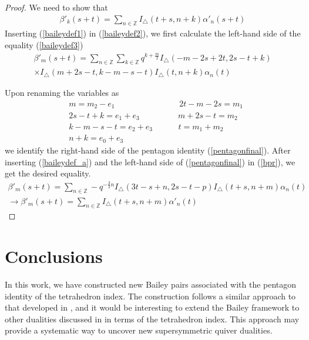 \documentclass[11pt,a4paper]{article}
\begin{document}
\begin{proof} We need to show that
\begin{align}
     \beta'_k (s + t)= \sum_{n \in \mathbb{Z}} I_{\triangle}(t + s, n + k) \alpha'_n(s + t)
     \label{baileydef3}
\end{align}
Inserting (\ref{baileydef1}) in (\ref{baileydef2}), we first calculate the left-hand side of the equality (\ref{baileydef3})
\begin{multline} \label{bpr}
    \beta'_m(s + t)= 
    \sum_{n \in \mathbb{Z}} \sum_{k \in \mathbb{Z}}q^{k + \frac{m}{2}}  I_{\triangle}(-m - 2s + 2t,2s - t + k)\\ \times I_{\triangle}(m + 2s - t,k -m - s - t)  I_{\triangle}(t, n + k) \alpha_n(t) \end{multline}

Upon renaming the variables as
\begin{align}
    &m = m_2 - e_1  \qquad \qquad \quad \qquad \; \; \;
    2t -m - 2s = m_1 \\ 
    &2s - t + k = e_1 + e_3   \qquad \; \; \; \; \; \; \quad
    m + 2s - t = m_2 \\
    &k - m - s - t= e_2 + e_3  \; \; \; \;  \qquad
    t = m_1 + m_2 \\
    &n + k = e_0 + e_3
\end{align}
we identify the right-hand side of the pentagon identity (\ref{pentagonfinal}). After inserting (\ref{baileydef_a}) and the left-hand side of (\ref{pentagonfinal}) in (\ref{bpr}), we get the desired equality.
\begin{gather} \nonumber
    \beta'_m(s + t)=  \sum_{n \in \mathbb{Z}} -q^{-\frac{3}{2}n}I_{\triangle}(3t - s + n,2s - t  - p)I_{\triangle}(t+s, n+m)\alpha_n(t) \\
       \xrightarrow{} \beta'_m(s + t) =  \sum_{n \in \mathbb{Z}} I_{\triangle}(t+s, n+m)\alpha'_n(t)
\end{gather}
\end{proof}



\section{Conclusions}

In this work, we have constructed new Bailey pairs associated with the pentagon identity of the tetrahedron index. The construction follows a similar approach to that developed in \cite{Gahramanov:2021pgu}, and it would be interesting to extend the Bailey framework to other dualities discussed in \cite{Gahramanov:2022jxz,Bozkurt:2020gyy} in terms of the tetrahedron index. This approach may provide a systematic way to uncover new supersymmetric quiver dualities.
\end{document}
